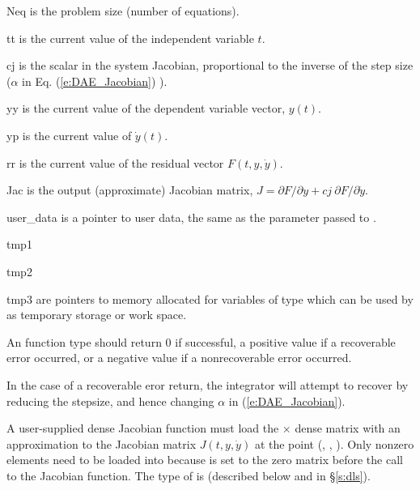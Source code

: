 {{}
{
  \begin{args}
  \item[Neq]
    is the problem size (number of equations).
  \item[tt]
    is the current value of the independent variable $t$.
  \item[cj]
    is the scalar in the system Jacobian, proportional to the inverse of the
    step size ($\alpha$ in Eq. (\ref{e:DAE_Jacobian}) ).
  \item[yy]
    is the current value of the dependent variable vector, $y(t)$.
  \item[yp]
    is the current value of $\dot{y}(t)$.
  \item[rr]
    is the current value of the residual vector $F(t,y,\dot{y})$.
  \item[Jac]
    is the output (approximate) Jacobian matrix,
    $J = \partial{F}/\partial{y} + cj ~ \partial{F}/\partial{\dot{y}}$.  
  \item[user\_data]
    is a pointer to user data, the same as the       
    parameter passed to .   
  \item[tmp1]
  \item[tmp2]
  \item[tmp3]
    are pointers to memory allocated for variables of type  
    which can be used by  as temporary storage or work space.
  \end{args}
}
{
  An  function type should return $0$ if successful,
  a positive value if a recoverable error occurred, or a negative value
  if a nonrecoverable error occurred. 

  In the case of a recoverable eror return, 
  the integrator will attempt to recover by reducing the stepsize,
  and hence changing $\alpha$ in (\ref{e:DAE_Jacobian}).
}
{
  A user-supplied dense Jacobian function must load the  $\times$ 
  dense matrix  with an approximation to the Jacobian matrix $J(t,y,\dot{y})$
  at the point (, , ).  Only nonzero elements need to be loaded
  into  because  is set to the zero matrix before the call
  to the Jacobian function. The type of  is  
  (described below and in \S\ref{s:dls}). 
  
}}
